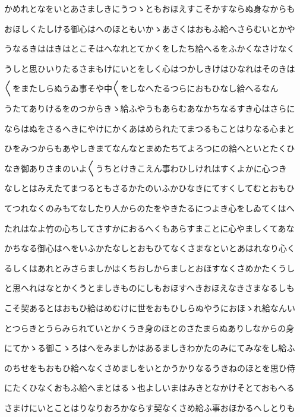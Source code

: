 \documentclass[a4paper,11pt,landscape]{ltjtarticle}
\begin{document}
\par\medskip
かめれとなをいとあさましきにうつゝともおほえすこそかすならぬ身なからも
\par\medskip
おほしくたしける御心はへのほともいかゝあさくはおもふ給へさらむいとかや
\par\medskip
うなるきははきはとこそはへなれとてかくをしたち給へるをふかくなさけなく
\par\medskip
うしと思ひいりたるさまもけにいとをしく心はつかしきけはひなれはそのきは
\par\medskip
〱をまたしらぬうゐ事そや中〱をしなへたるつらにおもひなし給へるなん
\par\medskip
うたてありけるをのつからきゝ給ふやうもあらむあなかちなるすき心はさらに
\par\medskip
ならはぬをさるへきにやけにかくあはめられたてまつるもことはりなる心まと
\par\medskip
ひをみつからもあやしきまてなんなとまめたちてよろつにの給へといとたくひ
\par\medskip
なき御ありさまのいよ〱うちとけきこえん事わひしけれはすくよかに心つき
\par\medskip
なしとはみえたてまつるともさるかたのいふかひなきにてすくしてむとおもひ
\par\medskip
てつれなくのみもてなしたり人からのたをやきたるにつよき心をしゐてくはへ
\par\medskip
たれはなよ竹の心ちしてさすかにおるへくもあらすまことに心やましくてあな
\par\medskip
かちなる御心はへをいふかたなしとおもひてなくさまなといとあはれなり心く
\par\medskip
るしくはあれとみさらましかはくちおしからましとおほすなくさめかたくうし
\par\medskip
と思へれはなとかくうとましきものにしもおほすへきおほえなきさまなるしも
\par\medskip
こそ契あるとはおもひ給はめむけに世をおもひしらぬやうにおほゝれ給なんい
\par\medskip
とつらきとうらみられていとかくうき身のほとのさたまらぬありしなからの身
\par\medskip
にてかゝる御こゝろはへをみましかはあるましきわかたのみにてみなをし給ふ
\par\medskip
のちせをもおもひ給へなくさめましをいとかうかりなるうきねのほとを思ひ侍
\par\medskip
にたくひなくおもふ給へまとはるゝ也よしいまはみきとなかけそとておもへる
\par\medskip
さまけにいとことはりなりおろかならす契なくさめ給ふ事おほかるへしとりも
\par\medskip
\end{document}
